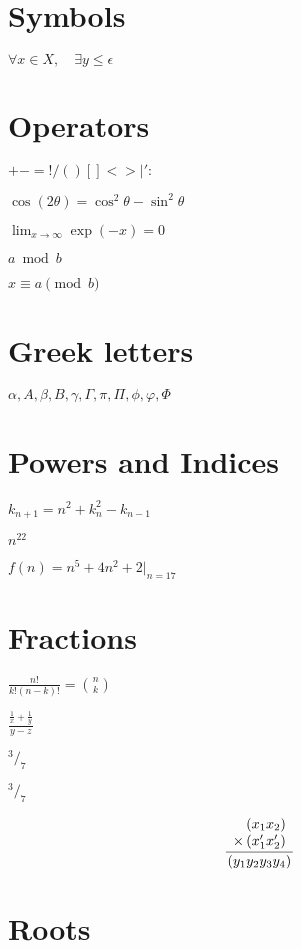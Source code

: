 \documentclass{article}
\begin{document}
\section{Symbols}
$\forall x \in X, \quad \exists y \leq \epsilon$

\section{Operators}
$+ - = ! / ( ) [ ] < > | ' :$

$\cos (2\theta) = \cos^2 \theta - \sin^2 \theta$

$\lim_{x \to \infty} \exp(-x) = 0$

$a \bmod b$

$x \equiv a \pmod b$


\section{Greek letters}
$\alpha, A, \beta, B, \gamma, \Gamma, \pi, \Pi, \phi, \varphi, \Phi$

\section{Powers and Indices}

$k_{n+1} = n^2 + k_n^2 - k_{n-1}$

$n^{22}$

$f(n) = n^5 + 4n^2 + 2 |_{n=17}$


\section{Fractions}

$\frac{n!}{k!(n-k)!} = \binom{n}{k}$



$\frac{\frac{1}{x}+\frac{1}{y}}{y-z}$



$^3/_7$

$\newcommand{\rfrac}[2]{{}^{#1}\!/_{#2}}
\rfrac{3}{7}$


\begin{equation}
\frac{
    \begin{array}[b]{r}
      \left( x_1 x_2 \right)\\
      \times \left( x'_1 x'_2 \right)
    \end{array}
  }{
    \left( y_1y_2y_3y_4 \right)
  }
\end{equation}


\section{Roots}
\end{document}
